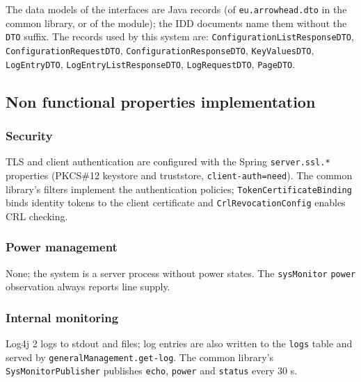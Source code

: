 \documentclass[a4paper]{arrowhead}
\begin{document}
The data models of the interfaces are Java records (of \texttt{eu.arrowhead.dto} in the common library, or of the module); the IDD documents name them without the \texttt{DTO} suffix. The records used by this system are: \texttt{Configuration\allowbreak{}List\allowbreak{}Response\allowbreak{}DTO}, \texttt{Configuration\allowbreak{}Request\allowbreak{}DTO}, \texttt{Configuration\allowbreak{}Response\allowbreak{}DTO}, \texttt{KeyValuesDTO}, \texttt{LogEntryDTO}, \texttt{Log\allowbreak{}Entry\allowbreak{}List\allowbreak{}Response\allowbreak{}DTO}, \texttt{LogRequestDTO}, \texttt{PageDTO}.

\subsection{Non functional properties implementation}

\subsubsection{Security}

TLS and client authentication are configured with the Spring \texttt{server.\allowbreak{}ssl.\allowbreak{}*} properties (PKCS\#12 keystore and truststore, \texttt{client-\allowbreak{}auth=\allowbreak{}need}). The common library's filters implement the authentication policies; \texttt{Token\allowbreak{}Certificate\allowbreak{}Binding} binds identity tokens to the client certificate and \texttt{Crl\allowbreak{}Revocation\allowbreak{}Config} enables CRL checking.

\subsubsection{Power management}

None; the system is a server process without power states. The \texttt{sysMonitor} \texttt{power} observation always reports line supply.

\subsubsection{Internal monitoring}

Log4j 2 logs to stdout and files; log entries are also written to the \texttt{logs} table and served by \texttt{general\allowbreak{}Management.\allowbreak{}get-\allowbreak{}log}. The common library's \texttt{Sys\allowbreak{}Monitor\allowbreak{}Publisher} publishes \texttt{echo}, \texttt{power} and \texttt{status} every 30 s.
\end{document}
